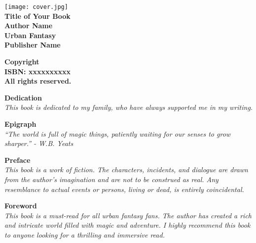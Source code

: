 \documentclass[12pt,twoside]{book}
\begin{document}
\frontmatter

\begin{titlepage}
\centering
\texttt{[image: cover.jpg]}\\[1cm]
\textbf{\Huge Title of Your Book}\\[1cm]
\textbf{\Large Author Name}\\[2cm]
\textbf{\large Urban Fantasy}\\[2cm]
\textbf{\small Publisher Name}\\[3cm]
\end{titlepage}


\clearpage
\thispagestyle{empty}
\vspace*{\fill}
\textbf{\Large Copyright }\\[1cm]
\textbf{\small ISBN: xxxxxxxxxx}\\[1cm]
\textbf{\small All rights reserved.}\\[2cm]
\vspace*{\fill}

\clearpage
\thispagestyle{empty}
\vspace*{\fill}
\textbf{\Large Dedication}\\[1cm]
\textit{This book is dedicated to my family, who have always supported me in my writing.}\\[2cm]
\vspace*{\fill}


\clearpage
\thispagestyle{empty}
\vspace*{\fill}
\textbf{\Large Epigraph}\\[1cm]
\textit{``The world is full of magic things, patiently waiting for our senses to grow sharper.” - W.B. Yeats}\\[2cm]
\vspace*{\fill}

\tableofcontents

\clearpage
\thispagestyle{empty}
\vspace*{\fill}
\textbf{\Large Preface}\\[1cm]
\textit{This book is a work of fiction. The characters, incidents, and dialogue are drawn from the author's imagination and are not to be construed as real. Any resemblance to actual events or persons, living or dead, is entirely coincidental.}\\[2cm]
\vspace*{\fill}

\clearpage
\thispagestyle{empty}
\vspace*{\fill}
\textbf{\Large Foreword}\\[1cm]
\textit{This book is a must-read for all urban fantasy fans. The author has created a rich and intricate world filled with magic and adventure. I highly recommend this book to anyone looking for a thrilling and immersive read.}\\[2cm]
\vspace*{\fill}
\end{document}
